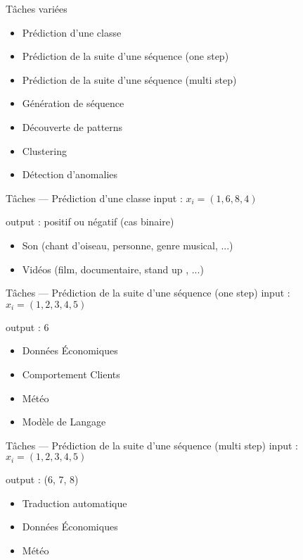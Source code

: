 \begin{frame}{Tâches variées}
  \begin{itemize}[<+->]
    \item Prédiction d'une classe
    \item Prédiction de la suite d'une séquence (one step)
    \item Prédiction de la suite d'une séquence (multi step)
    \item Génération de séquence
    \item Découverte de patterns
    \item Clustering
    \item Détection d'anomalies
  \end{itemize}
\end{frame}

\begin{frame}{Tâches --- Prédiction d'une classe}
  input : $x_i=(1,6,8,4)$

  output : positif ou négatif (cas binaire)

  \begin{itemize}
    \item Son (chant d'oiseau, personne, genre musical, ...)
    \item Vidéos (film, documentaire, stand up , ...)
  \end{itemize}
\end{frame}

\begin{frame}{Tâches --- Prédiction de la suite d'une séquence (one step)}
  input : $x_i=(1,2,3,4,5)$

  output : 6

  \begin{itemize}
    \item Données Économiques
    \item Comportement Clients
    \item Météo
    \item Modèle de Langage
  \end{itemize}
\end{frame}

\begin{frame}{Tâches --- Prédiction de la suite d'une séquence (multi step)}
  input : $x_i=(1,2,3,4,5)$

  output : (6, 7, 8)

  \begin{itemize}
    \item Traduction automatique
    \item Données Économiques
    \item Météo
  \end{itemize}
\end{frame}


